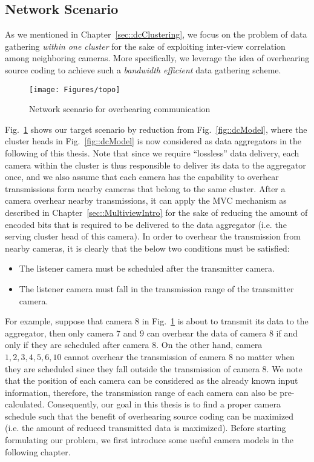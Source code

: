 \subsection{Network Scenario}
\label{sec::networkScenario}
%
As we mentioned in Chapter~\ref{sec::dcClustering}, we focus on the problem of data gathering \emph{within one cluster} for the sake of exploiting inter-view correlation among neighboring cameras.
More specifically, we leverage the idea of overhearing source coding to achieve such a \emph{bandwidth efficient} data gathering scheme.
%
\begin{figure}
\centering
\texttt{[image: Figures/topo]}
\caption{\label{fig::sysModel}Network scenario for overhearing communication}
\end{figure}
%
Fig.~\ref{fig::sysModel} shows our target scenario by reduction from Fig.~\ref{fig::dcModel}, where the cluster heads in Fig.~\ref{fig::dcModel} is now considered as data aggregators in the following of this thesis.
Note that since we require ``lossless'' data delivery, each camera within the cluster is thus responsible to deliver its data to the aggregator once, and we also assume that each camera has the capability to overhear transmissions form nearby cameras that belong to the same cluster.
After a camera overhear nearby transmissions, it can apply the MVC mechanism as described in Chapter~\ref{sec::MultiviewIntro} for the sake of reducing the amount of encoded bits that is required to be delivered to the data aggregator (i.e. the serving cluster head of this camera).
In order to overhear the transmission from nearby cameras, it is clearly that the below two conditions must be satisfied:
\begin{itemize}
\item The listener camera must be scheduled after the transmitter camera.
\item The listener camera must fall in the transmission range of the transmitter camera.
\end{itemize}
For example, suppose that camera $8$ in Fig.~\ref{fig::sysModel} is about to transmit its data to the aggregator, then only camera $7$ and $9$ can overhear the data of camera $8$ if and only if they are scheduled after camera $8$.
On the other hand, camera ${1,2,3,4,5,6,10}$ cannot overhear the transmission of camera $8$ no matter when they are scheduled since they fall outside the transmission of camera $8$.
We note that the position of each camera can be considered as the already known input information, therefore, the transmission range of each camera can also be pre-calculated.
Consequently, our goal in this thesis is to find a proper camera schedule such that the benefit of overhearing source coding can be maximized (i.e. the amount of reduced transmitted data is maximized).
Before starting formulating our problem, we first introduce some useful camera models in the following chapter.
